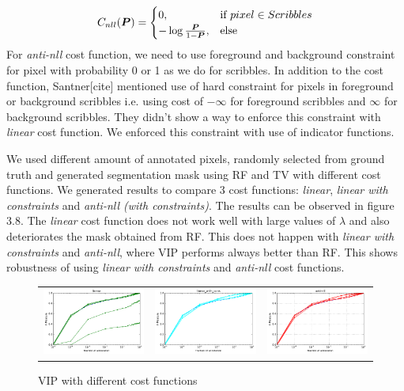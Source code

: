 \begin{align*}
\mathop{{}C_{nll}}(\boldsymbol{P}) =
\begin{cases}
  0, & \text{if}\ pixel \in Scribbles  \\
  -\log \frac{\boldsymbol{P}}{1-\boldsymbol{P}}, & \text{else}
\end{cases}
\end{align*} 
For \textit{anti-nll} cost function, we need to use foreground and background constraint for pixel with probability 0 or 1 as we do for scribbles. In addition to the cost function, Santner[cite] mentioned use of hard constraint for pixels in foreground or background scribbles i.e. using cost of $-\infty$ for foreground scribbles and $\infty$ for background scribbles. They didn't show a way to enforce this constraint with \textit{linear} cost function. We enforced this constraint with use of indicator functions. \par
We used different amount of annotated pixels, randomly selected from ground truth and generated segmentation mask using RF and TV with different cost functions. We generated results to compare 3 cost functions: \textit{linear}, \textit{linear with constraints} and \textit{anti-nll (with constraints)}. The results can be observed in figure 3.8. The 
\textit{linear} cost function does not work well with large values of $\lambda$ and also deteriorates the mask obtained from RF. This does not happen with \textit{linear with constraints} and \textit{anti-nll}, where VIP performs always better than RF. This shows robustness of using \textit{linear with constraints} and \textit{anti-nll} cost functions.
\begin{figure}[h!] \label{fig:rf_vip1}
\begin{tabular}{ccc}
 \includegraphics[width=0.33\linewidth]{figures/linear.pdf} & \includegraphics[width=0.33\linewidth]{figures/linear_with_cons.pdf} & \includegraphics[width=0.33\linewidth]{figures/anti_nll.pdf} \\
\end{tabular}
\caption{VIP with different cost functions}
\end{figure}


